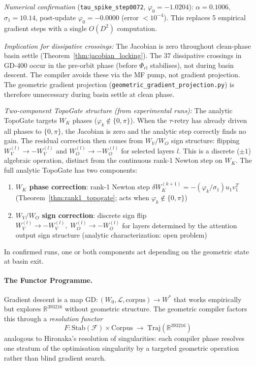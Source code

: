 \documentclass[11pt]{amsart}
\begin{document}
\emph{Numerical confirmation} (\texttt{tau\_spike\_step0072},
$\varphi_0 = -1.0204$):
$\alpha = 0.1006$, $\sigma_1 = 10.14$,
post-update $\varphi_0 = -0.0000$ (error $< 10^{-4}$).
This replaces 5 empirical gradient steps with a single $O(D^2)$ computation.

\emph{Implication for dissipative crossings:}
The Jacobian is zero throughout clean-phase basin settle
(Theorem~\ref{thm:jacobian_locking}).
The 37 dissipative crossings in GD-400 occur in the pre-orbit phase
(before $\Phi_\mathrm{cl}$ stabilises), not during basin descent.
The compiler avoids these via the MF pump, not gradient projection.
The geometric gradient projection (\texttt{geometric\_gradient\_projection.py})
is therefore unnecessary during basin settle at clean phase.

\emph{Two-component TopoGate structure (from experimental runs):}
The analytic TopoGate targets $W_K$ phases ($\varphi_k \notin \{0,\pi\}$).
When the $\tau$-retry has already driven all phases to $\{0,\pi\}$,
the Jacobian is zero and the analytic step correctly finds no gain.
The residual correction then comes from $W_V/W_O$ sign structure:
flipping $W_V^{(l)} \to -W_V^{(l)}$ and $W_O^{(l)} \to -W_O^{(l)}$
for selected layers $l$.
This is a discrete ($\pm 1$) algebraic operation, distinct from the
continuous rank-1 Newton step on $W_K$.
The full analytic TopoGate has two components:
\begin{enumerate}
\item \textbf{$W_K$ phase correction}: rank-1 Newton step
  $\delta W_K^{(k+1)} = -(\varphi_k/\sigma_1) u_1 v_1^T$
  (Theorem~\ref{thm:rank1_topogate}; acts when $\varphi_k \notin \{0,\pi\}$)
\item \textbf{$W_V/W_O$ sign correction}: discrete sign flip
  $W_V^{(l)} \to -W_V^{(l)},\; W_O^{(l)} \to -W_O^{(l)}$
  for layers determined by the attention output sign structure
  (analytic characterization: open problem)
\end{enumerate}
In confirmed runs, one or both components act depending on
the geometric state at basin exit.

\paragraph{The Functor Programme.}
Gradient descent is a map
$\mathrm{GD}: (W_0, \mathcal{L}, \mathrm{corpus}) \to W^*$
that works empirically but explores $\mathbb{R}^{393216}$ without
geometric structure.
The geometric compiler factors this through a \emph{resolution functor}
\[
  F: \mathrm{Stab}(\mathcal{F}) \times \mathrm{Corpus}
     \;\longrightarrow\; \mathrm{Traj}(\mathbb{R}^{393216})
\]
analogous to Hironaka's resolution of singularities:
each compiler phase resolves one stratum of the optimisation singularity
by a targeted geometric operation rather than blind gradient search.
\end{document}
